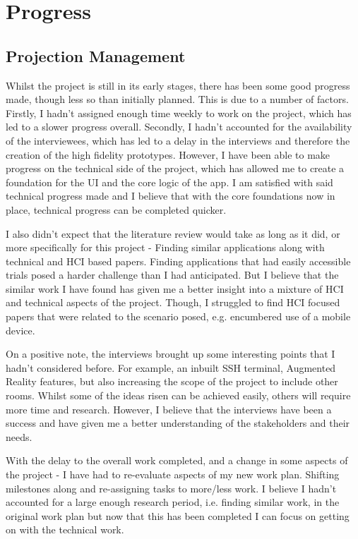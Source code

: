 \documentclass [11pt,a4paper]{article}
\begin{document}
\section{Progress}
\label{sec:progress}
\subsection{Projection Management}
\label{sec:project_management}
Whilst the project is still in its early stages, there has been some good progress made, though less so than initially planned. This is due to a number of factors. Firstly, I hadn't assigned enough time weekly to work on the project, which has led to a slower progress overall. Secondly, I hadn't accounted for the availability of the interviewees, which has led to a delay in the interviews and therefore the creation of the high fidelity prototypes. However, I have been able to make progress on the technical side of the project, which has allowed me to create a foundation for the UI and the core logic of the app. I am satisfied with said technical progress made and I believe that with the core foundations now in place, technical progress can be completed quicker.

I also didn't expect that the literature review would take as long as it did, or more specifically for this project - Finding similar applications along with technical and HCI based papers. Finding applications that had easily accessible trials posed a harder challenge than I had anticipated. But I believe that the similar work I have found has given me a better insight into a mixture of HCI and technical aspects of the project. Though, I struggled to find HCI focused papers that were related to the scenario posed, e.g. encumbered use of a mobile device. 

On a positive note, the interviews brought up some interesting points that I hadn't considered before. For example, an inbuilt SSH terminal, Augmented Reality features, but also increasing the scope of the project to include other rooms. Whilst some of the ideas risen can be achieved easily, others will require more time and research. However, I believe that the interviews have been a success and have given me a better understanding of the stakeholders and their needs.

With the delay to the overall work completed, and a change in some aspects of the project - I have had to re-evaluate aspects of my new work plan. Shifting milestones along and re-assigning tasks to more/less work. I believe I hadn't accounted for a large enough research period, i.e. finding similar work, in the original work plan but now that this has been completed I can focus on getting on with the technical work.
\end{document}
